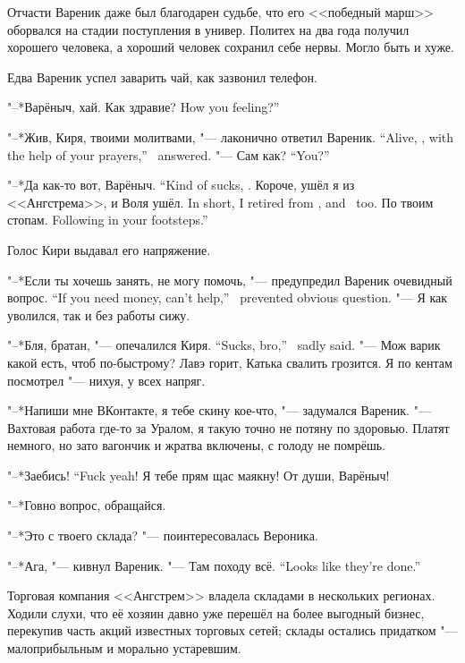 Отчасти Вареник даже был благодарен судьбе, что его <<победный марш>> оборвался на стадии поступления в универ.
Политех на два года получил хорошего человека, а хороший человек сохранил себе нервы.
Могло быть и хуже.

\asterism

Едва Вареник успел заварить чай, как зазвонил телефон.

"--*Варёныч, хай.
{Как здравие?}
{How you feeling?''}

{"--*Жив, Киря, твоими молитвами, "--- лаконично ответил Вареник.}
{``Alive, \Kirya, with the help of your prayers,'' \Varenik\ answered.}
{"--- Сам как?}
{``You?''}

{"--*Да как-то вот, Варёныч.}
{``Kind of sucks, \Varyonych.}
{Короче, ушёл я из <<Ангстрема>>, и Воля ушёл.}
{In short, I retired from \Angstrem, and \Volya\ too.}
{По твоим стопам.}
{Following in your footsteps.''}

Голос Кири выдавал его напряжение.

{"--*Если ты хочешь занять, не могу помочь, "--- предупредил Вареник очевидный вопрос.}
{``If you need money, can't help,'' \Varenik\ prevented obvious question.}
"--- Я как уволился, так и без работы сижу.

{"--*Бля, братан, "--- опечалился Киря.}
{``Sucks, bro,'' \Kirya\ sadly said.}
"--- Мож варик какой есть, чтоб по-быстрому?
Лавэ горит, Катька свалить грозится.
Я по кентам посмотрел "--- нихуя, у всех напряг.

"--*Напиши мне ВКонтакте, я тебе скину кое-что, "--- задумался Вареник.
"--- Вахтовая работа где-то за Уралом, я такую точно не потяну по здоровью.
Платят немного, но зато вагончик и жратва включены, с голоду не помрёшь.

{"--*Заебись!}
{``Fuck yeah!}
Я тебе прям щас маякну!
От души, Варёныч!

"--*Говно вопрос, обращайся.

"--*Это с твоего склада? "--- поинтересовалась Вероника.

"--*Ага, "--- кивнул Вареник.
{"--- Там походу всё.}
{``Looks like they're done.''}

\asterism

Торговая компания <<Ангстрем>> владела складами в нескольких регионах.
Ходили слухи, что её хозяин давно уже перешёл на более выгодный бизнес, перекупив часть акций известных торговых сетей;
склады остались придатком "--- малоприбыльным и морально устаревшим.

